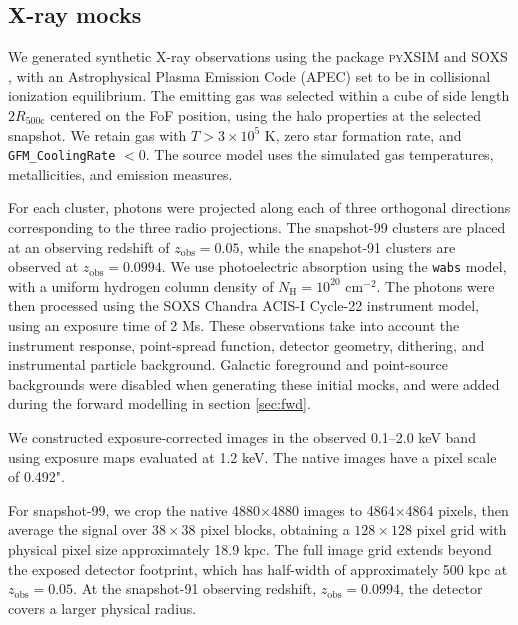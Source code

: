 \subsection{X-ray mocks}

We generated synthetic X-ray observations using the package \textsc{pyXSIM} \citep{ZuHone2016} and SOXS \citep{ZuHone2023}, with an Astrophysical Plasma Emission Code (APEC) set to be in collisional ionization equilibrium.
The emitting gas was selected within a cube of side length $2 R_{500\text{c}}$ centered on the FoF position, using the halo properties at the selected snapshot.
We retain gas with $T > 3 \times 10^5$ K, zero star formation rate, and \texttt{GFM\_CoolingRate} $<0$.
The source model uses the simulated gas temperatures, metallicities, and emission measures.

For each cluster, photons were projected along each of three orthogonal directions corresponding to the three radio projections.
The snapshot-99 clusters are placed at an observing redshift of $z_{\text{obs}} = 0.05$, while the snapshot-91 clusters are observed at $z_\text{obs} = 0.0994$.
We use photoelectric absorption using the \texttt{wabs} model, with a uniform hydrogen column density of $N_\text{H}= 10^{20}$ cm$^{-2}$.
The photons were then processed using the \textsc{SOXS} Chandra ACIS-I Cycle-22 instrument model, using an exposure time of 2 Ms.
These observations take into account the instrument response, point-spread function, detector geometry, dithering, and instrumental particle background.
Galactic foreground and point-source backgrounds were disabled when generating these initial mocks, and were added during the forward modelling in section \ref{sec:fwd}.

We constructed exposure-corrected images in the observed 0.1--2.0 keV band using exposure maps evaluated at 1.2 keV.
The native images have a pixel scale of 0.492".


For snapshot-99, we crop the native 4880$\times$4880 images to 4864$\times$4864 pixels, then average the signal over $38\times38$ pixel blocks, obtaining a $128\times128$ pixel grid with physical pixel size approximately 18.9 kpc.
The full image grid extends beyond the exposed detector footprint, which has half-width of approximately 500 kpc at $z_\text{obs} = 0.05$.
At the snapshot-91 observing redshift, $z_\text{obs} = 0.0994$, the detector covers a larger physical radius.

